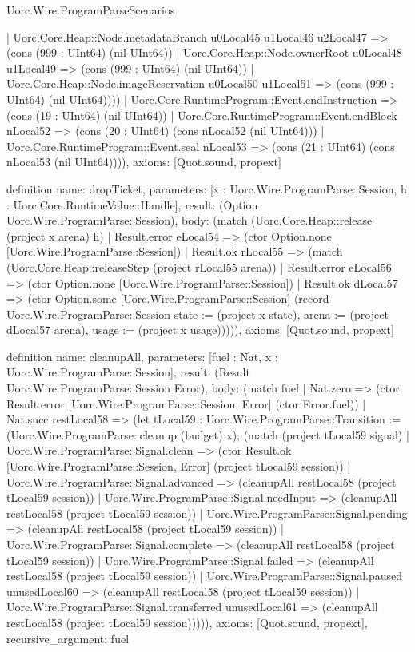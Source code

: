 \begin{lexlean}{Uorc.Wire.ProgramParseScenarios}
\begin{semanticmodule}
{        | Uorc.Core.Heap::Node.metadataBranch u0Local45 u1Local46 u2Local47 => (cons (999 : UInt64) (nil UInt64))
        | Uorc.Core.Heap::Node.ownerRoot u0Local48 u1Local49 => (cons (999 : UInt64) (nil UInt64))
        | Uorc.Core.Heap::Node.imageReservation u0Local50 u1Local51 => (cons (999 : UInt64) (nil UInt64))))
    | Uorc.Core.RuntimeProgram::Event.endInstruction => (cons (19 : UInt64) (nil UInt64))
    | Uorc.Core.RuntimeProgram::Event.endBlock nLocal52 => (cons (20 : UInt64) (cons nLocal52 (nil UInt64)))
    | Uorc.Core.RuntimeProgram::Event.seal nLocal53 => (cons (21 : UInt64) (cons nLocal53 (nil UInt64)))),
  axioms: [Quot.sound, propext]
}

definition{
  name: dropTicket,
  parameters: [x : Uorc.Wire.ProgramParse::Session, h : Uorc.Core.RuntimeValue::Handle],
  result: (Option Uorc.Wire.ProgramParse::Session),
  body: (match (Uorc.Core.Heap::release (project x arena) h)
    | Result.error eLocal54 => (ctor Option.none [Uorc.Wire.ProgramParse::Session])
    | Result.ok rLocal55 => (match (Uorc.Core.Heap::releaseStep (project rLocal55 arena))
      | Result.error eLocal56 => (ctor Option.none [Uorc.Wire.ProgramParse::Session])
      | Result.ok dLocal57 => (ctor Option.some [Uorc.Wire.ProgramParse::Session] (record Uorc.Wire.ProgramParse::Session {state := (project x state), arena := (project dLocal57 arena), usage := (project x usage)})))),
  axioms: [Quot.sound, propext]
}

definition{
  name: cleanupAll,
  parameters: [fuel : Nat, x : Uorc.Wire.ProgramParse::Session],
  result: (Result Uorc.Wire.ProgramParse::Session Error),
  body: (match fuel
    | Nat.zero => (ctor Result.error [Uorc.Wire.ProgramParse::Session, Error] (ctor Error.fuel))
    | Nat.succ restLocal58 => (let tLocal59 : Uorc.Wire.ProgramParse::Transition := (Uorc.Wire.ProgramParse::cleanup (budget) x); (match (project tLocal59 signal)
      | Uorc.Wire.ProgramParse::Signal.clean => (ctor Result.ok [Uorc.Wire.ProgramParse::Session, Error] (project tLocal59 session))
      | Uorc.Wire.ProgramParse::Signal.advanced => (cleanupAll restLocal58 (project tLocal59 session))
      | Uorc.Wire.ProgramParse::Signal.needInput => (cleanupAll restLocal58 (project tLocal59 session))
      | Uorc.Wire.ProgramParse::Signal.pending => (cleanupAll restLocal58 (project tLocal59 session))
      | Uorc.Wire.ProgramParse::Signal.complete => (cleanupAll restLocal58 (project tLocal59 session))
      | Uorc.Wire.ProgramParse::Signal.failed => (cleanupAll restLocal58 (project tLocal59 session))
      | Uorc.Wire.ProgramParse::Signal.paused unusedLocal60 => (cleanupAll restLocal58 (project tLocal59 session))
      | Uorc.Wire.ProgramParse::Signal.transferred unusedLocal61 => (cleanupAll restLocal58 (project tLocal59 session))))),
  axioms: [Quot.sound, propext],
  recursive_argument: fuel
}


\end{semanticmodule}
\end{lexlean}
